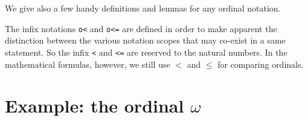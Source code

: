 \label{types:ON}




We give  also a few handy definitions and lemmas for any ordinal notation.

\label{sect:on-lt-notation}
\label{sect:on-le-notation}
\label{sect:measure-ON}
\label{sect:bigO-ON}



\begin{remark}
The infix notations \texttt{o<} and \texttt{o<=} are defined in order to make apparent the distinction between the various notation scopes that may co-exist in a same statement. So the infix \texttt{<} and \texttt{<=} are reserved to the natural numbers. In the mathematical formulas, however, we still use $<$ and $\leq$ for comparing ordinals.
\end{remark}




            



\section{Example: the ordinal \texorpdfstring{$\omega$}{omega}}




